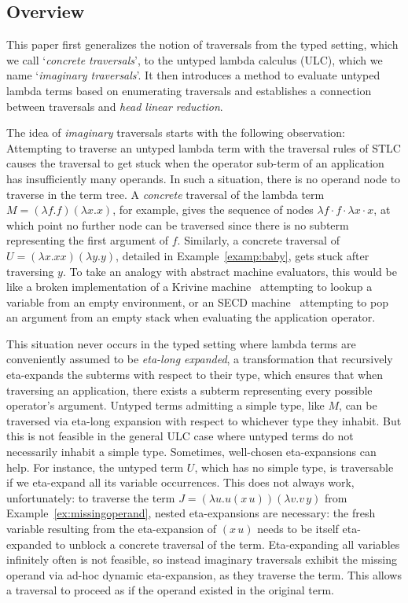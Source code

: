 \documentclass{elsarticle}
\theoremstyle{plain}
\theoremstyle{definition}
\begin{document}
\subsection{Overview}
This paper first generalizes the notion of traversals from the typed setting, which we call `\emph{concrete traversals}', to the untyped lambda calculus (ULC), which we name `\emph{imaginary traversals}'.
It then introduces a method to evaluate untyped lambda terms based on enumerating traversals and establishes a connection between traversals and \emph{head linear reduction}.

The idea of \emph{imaginary} traversals starts with the following observation:
Attempting to traverse an untyped lambda term with the
traversal rules of STLC causes the traversal to get stuck when the operator sub-term of an application has insufficiently many operands. In such a situation, there is no operand node to traverse in the term tree.
A \emph{concrete} traversal of the lambda term $M = (\lambda f.f)(\lambda x.x)$, for example,  gives the sequence of nodes $\lambda f \cdot f \cdot \lambda x \cdot x$, at which point no further node can be traversed since there is no subterm representing the first argument of $f$.
Similarly, a concrete traversal of $U = (\lambda x. x x)(\lambda y. y)$,
detailed in Example~\ref{examp:baby}, gets stuck after traversing $y$. To take an analogy with abstract machine evaluators, this would be like a broken implementation of a Krivine machine~\cite{Krivine2007} attempting to lookup a variable from an empty environment, or an SECD machine~\cite{landin-secd} attempting to pop an argument from an empty stack when evaluating the application operator.

This situation never occurs in the typed setting where lambda terms are
conveniently assumed to be \emph{eta-long expanded}, a transformation that recursively eta-expands the subterms with respect to their type,
which ensures that when traversing an application, there exists a subterm representing every possible operator's argument.
%
Untyped terms admitting a simple type, like $M$, can be traversed via eta-long expansion with respect to whichever type they inhabit.
But this is not feasible in the general ULC case where untyped terms do not necessarily inhabit a simple type.
Sometimes, well-chosen eta-expansions can help. For instance, the untyped term $U$, which has no simple type, is traversable if we eta-expand all its variable occurrences. This does not always work, unfortunately: to traverse the
term $J = (\lambda u . u(x\, u)) (\lambda v . v\, y)$ from
 Example~\ref{ex:missingoperand}, nested eta-expansions are necessary:
 the fresh variable resulting from the eta-expansion of $(x\, u)$ needs to be itself eta-expanded to unblock a concrete traversal of the term.
 Eta-expanding all variables infinitely often is not feasible, so instead imaginary traversals exhibit the missing operand via ad-hoc dynamic eta-expansion, as they traverse the term.
 This allows a traversal to proceed as if the operand existed in the original term.
\end{document}
